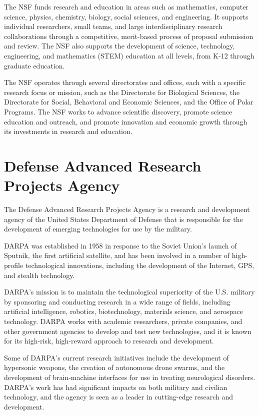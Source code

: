 \documentclass[
]{book}
\begin{document}
The NSF funds research and education in areas such as mathematics, computer science, physics, chemistry, biology, social sciences, and engineering. It supports individual researchers, small teams, and large interdisciplinary research collaborations through a competitive, merit-based process of proposal submission and review. The NSF also supports the development of science, technology, engineering, and mathematics (STEM) education at all levels, from K-12 through graduate education.

The NSF operates through several directorates and offices, each with a specific research focus or mission, such as the Directorate for Biological Sciences, the Directorate for Social, Behavioral and Economic Sciences, and the Office of Polar Programs. The NSF works to advance scientific discovery, promote science education and outreach, and promote innovation and economic growth through its investments in research and education.

\hypertarget{darpa}{%
\section{Defense Advanced Research Projects Agency}\label{darpa}}

The Defense Advanced Research Projects Agency is a research and development agency of the United States Department of Defense that is responsible for the development of emerging technologies for use by the military.

DARPA was established in 1958 in response to the Soviet Union's launch of Sputnik, the first artificial satellite, and has been involved in a number of high-profile technological innovations, including the development of the Internet, GPS, and stealth technology.

DARPA's mission is to maintain the technological superiority of the U.S. military by sponsoring and conducting research in a wide range of fields, including artificial intelligence, robotics, biotechnology, materials science, and aerospace technology. DARPA works with academic researchers, private companies, and other government agencies to develop and test new technologies, and it is known for its high-risk, high-reward approach to research and development.

Some of DARPA's current research initiatives include the development of hypersonic weapons, the creation of autonomous drone swarms, and the development of brain-machine interfaces for use in treating neurological disorders. DARPA's work has had significant impacts on both military and civilian technology, and the agency is seen as a leader in cutting-edge research and development.
\end{document}
